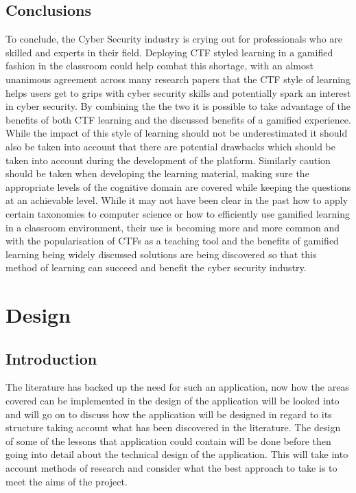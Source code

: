 \documentclass[12pt,a4paper]{article}
\begin{document}
\subsection{Conclusions}
To conclude, the Cyber Security industry is crying out for professionals who are skilled and experts in their field. Deploying CTF styled learning in a gamified fashion in the classroom could help combat this shortage, with an almost unanimous agreement across many research papers that  the CTF style of learning helps users get to grips with cyber security skills and potentially spark an interest in cyber security. By combining the the two it is possible to take advantage of the benefits of both CTF learning and the discussed benefits of a gamified experience. While the impact of this style of learning should not be underestimated it should also be taken into account that there are potential drawbacks which should be taken into account during the development of the platform. Similarly caution should be taken when developing the learning material, making sure the appropriate levels of the cognitive domain are covered while keeping the questions at an achievable level. While it may not have been clear in the past how to apply certain taxonomies to computer science or how to efficiently use gamified learning in a classroom environment, their use is becoming more and more common and with the popularisation of CTFs as a teaching tool and the benefits of gamified learning being widely discussed solutions are being discovered so that this method of learning can succeed and benefit the cyber security industry.

 
\newpage
\section{Design}
\subsection{Introduction}  
The literature has backed up the need for such an application, now how the areas covered can be implemented in the design of the application will be looked into and will go on to discuss how the application will be designed in regard to its structure taking account what has been discovered in the literature. The design of some of the lessons that application could contain will be done before then going into detail about the technical design of the application. This will take into account methods of research and consider what the best approach to take is to meet the aims of the project. 
\end{document}
